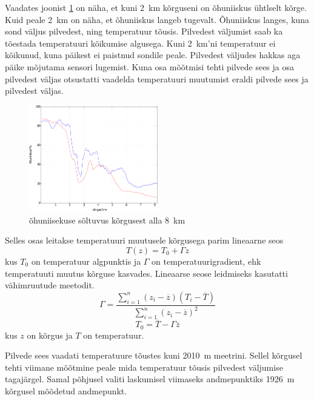 \documentclass{trkut}%
\begin{document}
Vaadates joonist \ref{humkõrtrop} on näha, et kuni \SI{2}{km} kõrguseni on õhuniiskus ühtlselt kõrge. Kuid peale \SI{2}{km} on näha, et õhuniiskus langeb tugevalt. Õhuniiskus langes, kuna sond väljus pilvedest, ning temperatuur tõusis. Pilvedest väljumist saab ka tõestada temperatuuri kõikumise algusega. Kuni \SI{2}{km}'ni temperatuur ei kõikunud, kuna päikest ei paistnud sondile peale. Pilvedest väljudes hakkas aga päike mõjutama sensori lugemist. Kuna osa mõõtmisi tehti pilvede sees ja osa pilvedest väljas otsustatti vaadelda temperatuuri muutumist eraldi pilvede sees ja pilvedest väljas.
\begin{figure}[h]
	\includegraphics[width=0.5\textwidth]{PicGra/humkõrtrop.pdf}
	\caption{õhuniisekuse sõltuvus kõrgusest alla \SI{8}{km}}
	\label{humkõrtrop}%
\end{figure}

Selles osas leitakse temperatuuri muutusele kõrgusega parim lineaarne seos
\begin{equation*}
T(z) = T_0 + \Gamma z
\end{equation*}
kus $T_0$ on temperatuur algpunktis ja $\Gamma$ on temperatuurigradient, ehk temperatuuti muutus kõrguse kasvades. Lineaarse seose leidmiseks kasutatti vähimruutude meetodit.
\begin{equation*}
\Gamma = \frac{\sum_{i=1}^{n}(z_i - \overline{z})(T_i - \overline{T})}{\sum_{i=1}^{n}(z_i - \overline{z})^2}
\end{equation*}
\begin{equation*}
T_0 = \overline{T} - \Gamma \overline{z}
\end{equation*}
kus $z$ on kõrgus ja $T$ on temperatuur.

Pilvede sees vaadati temperatuure tõustes kuni  \SI{2010}{m} meetrini. Sellel kõrgusel tehti viimane mõõtmine peale mida temperatuur tõusis pilvedest väljumise tagajärgel. Samal põhjusel valiti laskumisel viimaseks andmepunktiks \SI{1926}{m} kõrgusel mõõdetud andmepunkt.
\end{document}
